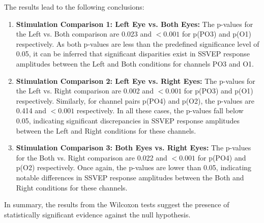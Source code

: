 The results lead to the following conclusions:

\begin{enumerate}
    \item \textbf{Stimulation Comparison 1: Left Eye vs. Both Eyes:}
    The p-values for the Left vs. Both comparison are 0.023 and $<0.001$ for p(PO3) and p(O1) respectively. As both p-values are less than the predefined significance level of 0.05, it can be inferred that significant disparities exist in SSVEP response amplitudes between the Left and Both conditions for channels PO3 and O1.
    
    \item \textbf{Stimulation Comparison 2: Left Eye vs. Right Eyes:}
    The p-values for the Left vs. Right comparison are 0.002 and $<0.001$ for p(PO3) and p(O1) respectively. Similarly, for channel pairs p(PO4) and p(O2), the p-values are 0.414 and $<0.001$ respectively. In all these cases, the p-values fall below 0.05, indicating significant discrepancies in SSVEP response amplitudes between the Left and Right conditions for these channels.
    
    \item \textbf{Stimulation Comparison 3: Both Eyes vs. Right Eyes:}
    The p-values for the Both vs. Right comparison are 0.022 and $<0.001$ for p(PO4) and p(O2) respectively. Once again, the p-values are lower than 0.05, indicating notable differences in SSVEP response amplitudes between the Both and Right conditions for these channels.
\end{enumerate}

In summary, the results from the Wilcoxon tests suggest the presence of statistically significant evidence against the null hypothesis.


